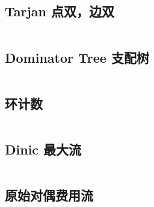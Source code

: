 				\subsection{Tarjan 点双，边双}
					\inputminted{cpp}{src/TreeandGraph/Tarjan.cpp}
				\subsection{Dominator Tree 支配树}
					\inputminted{cpp}{src/TreeandGraph/支配树.cpp}
				\subsection{环计数}
					\inputminted{cpp}{src/TreeandGraph/环计数.cpp}
				\subsection{Dinic 最大流}
					
					\inputminted[highlightlines={8,30}]{cpp}{src/TreeandGraph/Dinic.cpp}
				\subsection{原始对偶费用流}
					\inputminted[highlightlines={2,3,22,25,28,31,42,43}]{cpp}{src/TreeandGraph/多路增广费用流.cpp}
